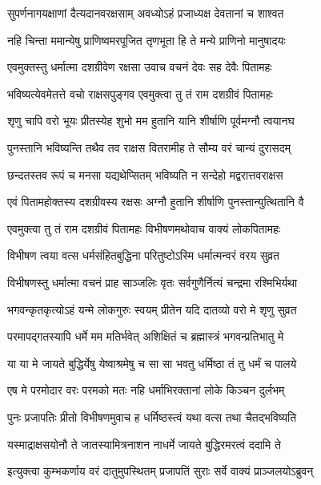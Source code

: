\twolineshloka
{सुपर्णनागयक्षाणां दैत्यदानवरक्षसाम्}
{अवध्योऽहं प्रजाध्यक्ष देवतानां च शाश्वत} %

\twolineshloka
{नहि चिन्ता ममान्येषु प्राणिष्वमरपूजित}
{तृणभूता हि ते मन्ये प्राणिनो मानुषादयः} %

\twolineshloka
{एवमुक्तस्तु धर्मात्मा दशग्रीवेण रक्षसा}
{उवाच वचनं देवः सह देवैः पितामहः} %

\twolineshloka
{भविष्यत्येवमेतत्ते वचो राक्षसपुङ्गव}
{एवमुक्त्वा तु तं राम दशग्रीवं पितामहः} %

\twolineshloka
{शृणु चापि वरो भूयः प्रीतस्येह शुभो मम}
{हुतानि यानि शीर्षाणि पूर्वमग्नौ त्वयानघ} %

\twolineshloka
{पुनस्तानि भविष्यन्ति तथैव तव राक्षस}
{वितरामीह ते सौम्य वरं चान्यं दुरासदम्} %

\twolineshloka
{छन्दतस्तव रूपं च मनसा यद्यथेप्सितम्}
{भविष्यति न सन्देहो मद्वरात्तवराक्षस} %

\twolineshloka
{एवं पितामहोक्तस्य दशग्रीवस्य रक्षसः}
{अग्नौ हुतानि शीर्षाणि पुनस्तान्युत्थितानि वै} %

\twolineshloka
{एवमुक्त्वा तु तं राम दशग्रीवं पितामहः}
{विभीषणमथोवाच वाक्यं लोकपितामहः} %

\twolineshloka
{विभीषण त्वया वत्स धर्मसंहितबुद्धिना}
{परितुष्टोऽस्मि धर्मात्मन्वरं वरय सुव्रत} %

\twolineshloka
{विभीषणस्तु धर्मात्मा वचनं प्राह साञ्जलिः}
{वृतः सर्वगुणैर्नित्यं चन्द्रमा रश्मिभिर्यथा} %

\twolineshloka
{भगवन्कृतकृत्योऽहं यन्मे लोकगुरुः स्वयम्}
{प्रीतेन यदि दातव्यो वरो मे शृणु सुव्रत} %

\twolineshloka
{परमापद्गतस्यापि धर्मे मम मतिर्भवेत्}
{अशिक्षितं च ब्रह्मास्त्रं भगवन्प्रतिभातु मे} %

\twolineshloka
{या या मे जायते बुद्धिर्येषु येष्वाश्रमेषु च}
{सा सा भवतु धर्मिष्ठा तं तु धर्मं च पालये} %

\twolineshloka
{एष मे परमोदार वरः परमको मतः}
{नहि धर्माभिरक्तानां लोके किञ्चन दुर्लभम्} %

\twolineshloka
{पुनः प्रजापतिः प्रीतो विभीषणमुवाच ह}
{धर्मिष्ठस्त्वं यथा वत्स तथा चैतद्भविष्यति} %

\twolineshloka
{यस्माद्राक्षसयोनौ ते जातस्यामित्रनाशन}
{नाधर्मे जायते बुद्धिरमरत्वं ददामि ते} %

\twolineshloka
{इत्युक्त्वा कुम्भकर्णाय वरं दातुमुपस्थितम्}
{प्रजापतिं सुराः सर्वे वाक्यं प्राञ्जलयोऽब्रुवन्} %

